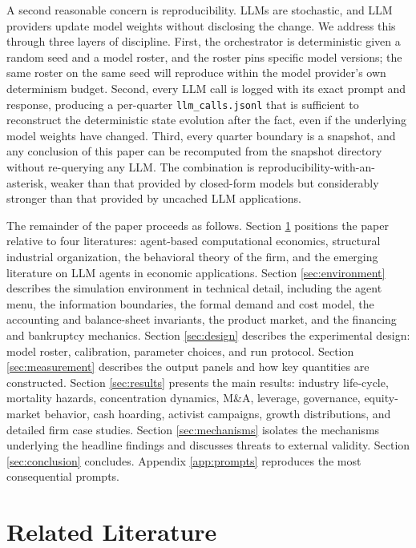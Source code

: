 \documentclass[11pt]{article}
\begin{document}
A second reasonable concern is reproducibility. LLMs are stochastic, and
LLM providers update model weights without disclosing the change. We
address this through three layers of discipline. First, the orchestrator
is deterministic given a random seed and a model roster, and the
roster pins specific model versions; the same roster on the same seed
will reproduce within the model provider's own determinism budget.
Second, every LLM call is logged with its exact prompt and response,
producing a per-quarter \texttt{llm\_calls.jsonl} that is sufficient to
reconstruct the deterministic state evolution after the fact, even if
the underlying model weights have changed. Third, every quarter
boundary is a snapshot, and any conclusion of this paper can be
recomputed from the snapshot directory without re-querying any LLM. The
combination is reproducibility-with-an-asterisk, weaker than that
provided by closed-form models but considerably stronger than that
provided by uncached LLM applications.

The remainder of the paper proceeds as follows. Section \ref{sec:literature}
positions the paper relative to four literatures: agent-based computational
economics, structural industrial organization, the behavioral theory of
the firm, and the emerging literature on LLM agents in economic
applications. Section \ref{sec:environment} describes the simulation
environment in technical detail, including the agent menu, the information
boundaries, the formal demand and cost model, the accounting and
balance-sheet invariants, the product market, and the financing and
bankruptcy mechanics. Section \ref{sec:design}
describes the experimental design: model roster, calibration, parameter
choices, and run protocol. Section \ref{sec:measurement} describes the
output panels and how key quantities are constructed. Section
\ref{sec:results} presents the main results: industry life-cycle,
mortality hazards, concentration dynamics, M\&A, leverage, governance,
equity-market behavior, cash hoarding, activist campaigns, growth
distributions, and detailed firm case studies. Section \ref{sec:mechanisms}
isolates the mechanisms underlying the headline findings and discusses
threats to external validity. Section \ref{sec:conclusion} concludes.
Appendix \ref{app:prompts} reproduces the most consequential prompts.

\section{Related Literature}\label{sec:literature}
\end{document}
